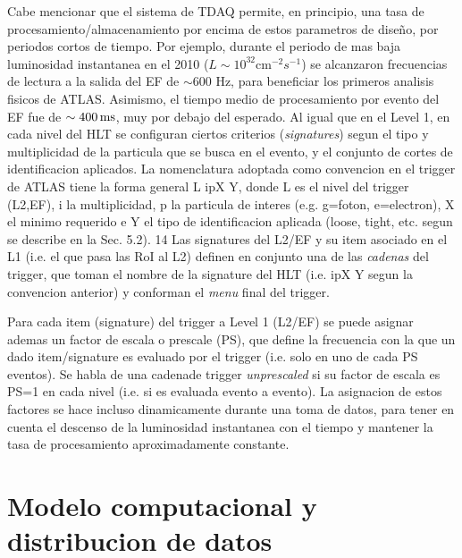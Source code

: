 Cabe mencionar que el sistema de TDAQ permite, en principio, una tasa de procesamiento/almacenamiento
por encima de estos parametros de dise\~no, por periodos cortos de tiempo. Por ejemplo, durante el
periodo de mas baja luminosidad instantanea en el 2010 ($L\sim 10^{32} \text{cm}^{-2} s^{-1}$) se alcanzaron
frecuencias de lectura a la salida del EF de $\sim 600$ Hz, para beneficiar los primeros analisis
fisicos de ATLAS. Asimismo, el tiempo medio de procesamiento por evento del EF fue de $\sim \unit[400]{ms}$,
muy por debajo del esperado.
Al igual que en el Level 1, en cada nivel del HLT se configuran ciertos criterios
(\emph{signatures}) segun el tipo y multiplicidad de la particula que se busca en el evento,
y el conjunto de cortes de identificacion aplicados. La nomenclatura adoptada como convencion
en el trigger de ATLAS tiene la forma general L ipX Y, donde L es el nivel del
trigger (L2,EF), i la multiplicidad, p la particula de interes (e.g. g=foton, e=electron),
X el {\pt} minimo requerido e Y el tipo de identificacion aplicada (loose, tight, etc. segun
se describe en la Sec. 5.2). 14 Las signatures del L2/EF y su  item asociado en el L1 (i.e. el
que pasa las RoI al L2) definen en conjunto una de las \emph{cadenas} del trigger, que toman
el nombre de la signature del HLT (i.e. ipX Y segun la convencion anterior) y conforman
el \emph{menu} final del trigger.


Para cada item (signature) del trigger a Level 1 (L2/EF) se puede asignar ademas un
factor de escala o prescale (PS), que define la frecuencia con la que un dado item/signature
es evaluado por el trigger (i.e. solo en uno de cada PS eventos). Se habla de una
cadenade trigger \emph{unprescaled} si su factor de escala es PS=1 en cada nivel (i.e. si es evaluada
evento a evento). La asignacion de estos factores se hace incluso dinamicamente durante
una toma de datos, para tener en cuenta el descenso de la luminosidad instantanea con el
tiempo y mantener la tasa de procesamiento aproximadamente constante.


\section{Modelo computacional y distribucion de datos}

